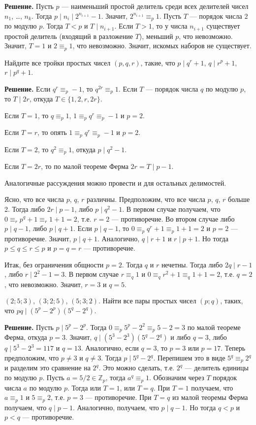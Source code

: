 \textbf{Решение.} Пусть $p$ --- наименьший простой делитель среди всех делителей
чисел $n_1$, \ldots, $n_k$. Тогда $p\mid n_i\mid 2^{n_{i+1}}-1$.
Значит, $2^{n_{i+1}}\equiv_p 1$. Пусть $T$ --- порядок числа
$2$ по модулю $p$. Тогда $T < p$ и $T\mid n_{i+1}$. Если $T>1$, то у
числа $n_{i+1}$ существует простой делитель (входящий в разложение
$T$), меньший $p$, что невозможно. Значит, $T=1$ и $2\equiv_p 1$, что невозможно. Значит, искомых наборов не существует.

 Найдите все тройки простых чисел $(p,q,r)$, такие,
что $p \mid q^r+1$, $q \mid r^p+1$, $r \mid p^q+1$.

\textbf{Решение.} Если $q^r\equiv_p -1$, то $q^{2r}\equiv_p 1$. Если $T$ --- порядок числа $q$ по модулю $p$, то $T\mid 2r$, откуда $T\in \{1,2,r,2r\}$. 

Если $T=1$, то $q\equiv_p 1$, $1\equiv_p q^r\equiv_p -1$ и $p=2$. 

Если $T=r$, то опять $1\equiv_p q^r\equiv_p  -1$ и $p=2$. 

Если $T=2$, то $q^2\equiv_p 1$, откуда $p\mid q^2-1$.

Если $T=2r$, то по малой теореме Ферма $2r=T\mid p-1$. 

Аналогичные рассуждения можно провести и для остальных делимостей.

Ясно, что все числа $p$, $q$, $r$ различны. Предположим, что все
числа $p$, $q$, $r$ больше 2. Тогда либо $2r\mid p-1$,
либо $p\mid q^2-1$. В первом случае получаем, что $0\equiv_r
p^q+1\equiv_r 1+1=2$, т.е. $r=2$ --- противоречие. Во втором
случае либо $p\mid q-1$, либо $p\mid q+1$. Если $p\mid q-1$, то
$0\equiv_p q^r+1\equiv_p 1+1=2$ и $p=2$ --- противоречие.
Значит, $p\mid q+1$. Аналогично, $q\mid r+1$ и $r\mid p+1$. Но тогда
$p\leqslant q\leqslant r\leqslant p$ и $p=q=r$ --- противоречие.

Итак, без ограничения общности $p=2$. Тогда $q$ и $r$ нечетны. Тогда либо $2q\mid r-1$, либо $r\mid
2^2-1=3$. В первом случае $r\equiv_q 1$ и $0\equiv_q
r^2+1\equiv_q 1+1=2$, т.е. $q=2$, что невозможно. Значит,
$r=3$ и $q=5$.

 $(2;5;3)$, $(3;2;5)$, $(5;3;2)$.
 Найти все пары простых чисел $(p;q)$, таких, что $pq \mid
(5^p-2^p)(5^q-2^q)$.

\textbf{Решение.} Пусть $p\mid 5^p-2^p$. Тогда $0\equiv_p 5^p-2^2\equiv_p 5-2=3$ по малой теореме Ферма, откуда $p=3$. Значит, $q\mid (5^3-2^3)(5^q-2^q)$ и либо $q=3$, либо $q\mid 5^3-2^3=117$ и $q=13$. Аналогично, если $q=3$, то $p=3$ или $p=17$. Теперь предположим, что $p\neq 3$ и $q\neq 3$. Тогда $p\mid 5^q-2^q$. Перепишем это в виде $5^q\equiv_p 2^q$ и разделим это сравнение на $2^q$. Это можно сделать, т.е. $2^q$ --- делитель единицы по модулю $p$. Пусть $a=5/2\in \mathbb{Z}_p$, тогда $a^q\equiv_p 1$. Обозначим через $T$ порядок числа $a$ по модулю $p$. Тогда или $T=1$, или $T=q$. При $T=1$ получаем, что $a\equiv_p 1$ и $5\equiv_p 2$, т.е. $p=3$ --- противоречие. При $T=q$ из малой теоремы Ферма получаем, что $q\mid p-1$. Аналогично, получаем, что $p\mid q-1$. Но тогда $q < p$ и $p < q$ --- противоречие.

